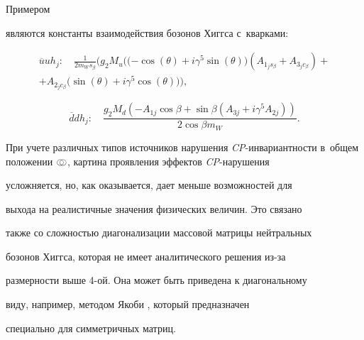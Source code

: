 Примером 


являются константы взаимодействия бозонов Хиггса с~кварками:

\begin{multline}

\overline{u}uh_j: \quad 

\frac{1}{2 m_W s_{\beta }}

\bigl(

g_2 M_u \bigl(

(-\cos (\theta )+i \gamma ^5 \sin (\theta ) \bigr)

 (A_{1_j s_{\beta }}+  A_{3_j c_{\beta }})+\\ 

+

A_{2_j c_{\beta }} 

\bigl(

\sin (\theta )+i \gamma ^5 \cos (\theta ) \bigr)

\bigr),

\end{multline}



\begin{equation}

\overline{d}dh_j: \quad  

\frac{g_2 M_d 

\left(-A_{1j} \cos \beta + \sin \beta \left(A_{3j}+i \gamma ^5 A_{2j}\right)\right)}

{2 \cos \beta  m_W}.

\end{equation}



При учете различных типов источников нарушения {\it CP}-инвариантности в~общем положении $\ocircle\,\,\!\!\!\!\!\!\!\!~\,\ocircle$, картина проявления эффектов {\it CP}-нарушения

усложняется, но, как оказывается, дает меньше возможностей для

выхода на реалистичные значения физических величин. Это связано

также со сложностью диагонализации массовой матрицы нейтральных

бозонов Хиггса, которая не имеет аналитического решения из-за

размерности выше 4-ой. Она может быть приведена к диагональному

виду, например, методом Якоби \cite{Shary}, который предназначен

специально для симметричных матриц.



